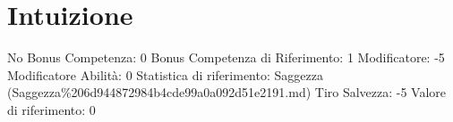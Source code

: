 \section{Intuizione}\label{intuizione}

\begin{description}
\tightlist
\item[Tags: ABI]
No Bonus Competenza: 0 Bonus Competenza di Riferimento: 1 Modificatore:
-5 Modificatore Abilità: 0 Statistica di riferimento: Saggezza
(Saggezza\%206d944872984b4cde99a0a092d51e2191.md) Tiro Salvezza: -5
Valore di riferimento: 0
\end{description}
